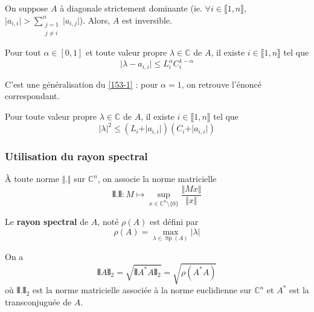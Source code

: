   \begin{corollary}
    On suppose $A$ à diagonale strictement dominante (ie. $\forall i \in \llbracket 1, n \rrbracket$, $\vert a_{i,i} \vert > \sum_{\substack{j=1 \\ j \neq i}}^n \vert a_{i,j} \vert$). Alors, $A$ est inversible.
  \end{corollary}

  \begin{theorem}[Ostrowski]
    Pour tout $\alpha \in [0,1]$ et toute valeur propre $\lambda \in \mathbb{C}$ de $A$, il existe $i \in \llbracket 1, n \rrbracket$ tel que
    \[ \vert \lambda - a_{i,i} \vert \leq L_i^{\alpha} C_i^{1-\alpha} \]
  \end{theorem}

  \begin{remark}
    C'est une généralisation du \cref{153-1} : pour $\alpha = 1$, on retrouve l'énoncé correspondant.
  \end{remark}

  \begin{corollary}
    Pour toute valeur propre $\lambda \in \mathbb{C}$ de $A$, il existe $i \in \llbracket 1, n \rrbracket$ tel que
    \[ \vert \lambda \vert^2 \leq (L_i + \vert a_{i,i} \vert) (C_i + \vert a_{i,i} \vert) \]
  \end{corollary}

  \subsubsection{Utilisation du rayon spectral}

  \begin{notation}
    À toute norme $\Vert . \Vert$ sur $\mathbb{C}^n$, on associe la norme matricielle
    \[ \VERT . \VERT : M \mapsto \sup_{x \in \mathbb{C}^n \setminus \{ 0 \}} \frac{\Vert Mx \Vert}{\Vert x \Vert} \]
  \end{notation}

  \begin{definition}
    Le \textbf{rayon spectral} de $A$, noté $\rho(A)$ est défini par
    \[ \rho(A) = \max_{\lambda \in \operatorname{Sp}(A)} \vert \lambda \vert \]
  \end{definition}

  \begin{theorem}
    On a
    \[ \VERT A \VERT_2 = \sqrt{\VERT A^* A \VERT_2} = \sqrt{\rho(A^* A)} \]
    où $\VERT . \VERT_2$ est la norme matricielle associée à la norme euclidienne sur $\mathbb{C}^n$ et $A^*$ est la transconjuguée de $A$.
  \end{theorem}


